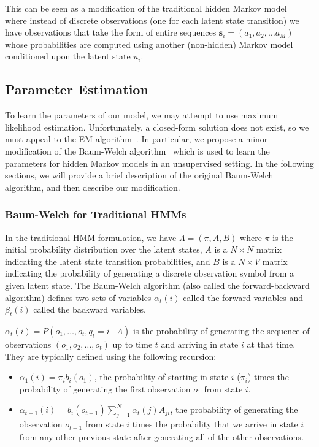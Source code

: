 This can be seen as a modification of the traditional hidden Markov
model~\cite{Rabiner:1990:RSR} where instead of discrete observations (one
for each latent state transition) we have observations that take the form
of entire sequences $\mathbf{s}_i = (a_1, a_2, \ldots a_M)$ whose
probabilities are computed using another (non-hidden) Markov model
conditioned upon the latent state $u_i$.

\subsection{Parameter Estimation}
To learn the parameters of our model, we may attempt to use maximum
likelihood estimation. Unfortunately, a closed-form solution does not
exist, so we must appeal to the EM algorithm~\cite{Dempster:1977:JRSS}. In
particular, we propose a minor modification of the Baum-Welch
algorithm~\cite{Rabiner:1990:RSR} which is used to learn the parameters for
hidden Markov models in an unsupervised setting. In the following sections,
we will provide a brief description of the original Baum-Welch algorithm,
and then describe our modification.

\subsubsection{Baum-Welch for Traditional HMMs}
In the traditional HMM formulation, we have $\Lambda = (\pi, A, B)$ where
$\pi$ is the initial probability distribution over the latent states,
$A$ is a $N\times N$ matrix indicating the latent state transition
probabilities, and $B$ is a $N \times V$ matrix indicating the probability
of generating a discrete observation symbol from a given latent state. The
Baum-Welch algorithm (also called the forward-backward algorithm) defines
two sets of variables $\alpha_t(i)$ called the forward variables and
$\beta_t(i)$ called the backward variables.

$\alpha_t(i) = P(o_1, \ldots, o_t, q_t = i \mid \Lambda)$ is the probability of
generating the sequence of observations $(o_1, o_2, \ldots, o_t)$ up to time
$t$ and arriving in state $i$ at that time. They are typically defined
using the following recursion:
\begin{itemize}
  \item $\alpha_1(i) = \pi_i b_i(o_1)$, the probability of starting in
    state $i$ ($\pi_i$) times the probability of generating the first
    observation $o_1$ from state $i$.
  \item $\alpha_{t+1}(i) = b_i(o_{t+1})\sum_{j=1}^N \alpha_t(j) A_{ji}$,
    the probability of generating the observation $o_{t+1}$ from state $i$
    times the probability that we arrive in state $i$ from any other
    previous state after generating all of the other observations.
\end{itemize}

